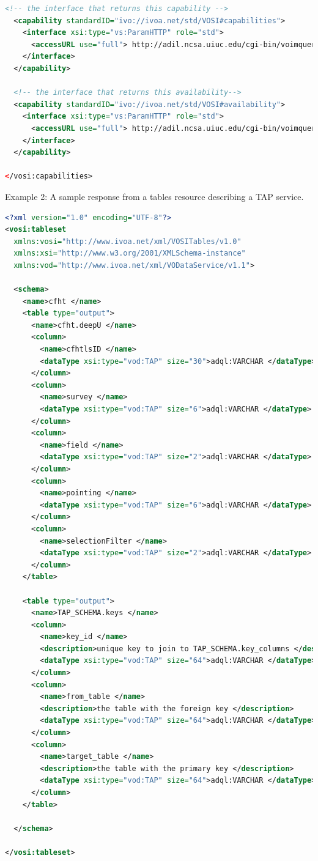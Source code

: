 \documentclass[11pt,letter]{ivoa}
\begin{document}
\begin{lstlisting}[language=XML]
  <!-- the interface that returns this capability -->
  <capability standardID="ivo://ivoa.net/std/VOSI#capabilities">
    <interface xsi:type="vs:ParamHTTP" role="std">
      <accessURL use="full"> http://adil.ncsa.uiuc.edu/cgi-bin/voimquery/capabilities </accessURL>
    </interface>
  </capability>

  <!-- the interface that returns this availability-->
  <capability standardID="ivo://ivoa.net/std/VOSI#availability">
    <interface xsi:type="vs:ParamHTTP" role="std">
      <accessURL use="full"> http://adil.ncsa.uiuc.edu/cgi-bin/voimquery/availability </accessURL>
    </interface>
  </capability>

</vosi:capabilities>
\end{lstlisting}


Example 2:
A sample response from a tables resource describing a TAP service. 

\begin{lstlisting}[language=XML]
<?xml version="1.0" encoding="UTF-8"?>
<vosi:tableset
  xmlns:vosi="http://www.ivoa.net/xml/VOSITables/v1.0"
  xmlns:xsi="http://www.w3.org/2001/XMLSchema-instance"
  xmlns:vod="http://www.ivoa.net/xml/VODataService/v1.1">

  <schema>
    <name>cfht </name>
    <table type="output">
      <name>cfht.deepU </name>
      <column>
        <name>cfhtlsID </name>
        <dataType xsi:type="vod:TAP" size="30">adql:VARCHAR </dataType>
      </column>
      <column>
        <name>survey </name>
        <dataType xsi:type="vod:TAP" size="6">adql:VARCHAR </dataType>
      </column>
      <column>
        <name>field </name>
        <dataType xsi:type="vod:TAP" size="2">adql:VARCHAR </dataType>
      </column>
      <column>
        <name>pointing </name>
        <dataType xsi:type="vod:TAP" size="6">adql:VARCHAR </dataType>
      </column>
      <column>
        <name>selectionFilter </name>
        <dataType xsi:type="vod:TAP" size="2">adql:VARCHAR </dataType>
      </column>
    </table>

    <table type="output">
      <name>TAP_SCHEMA.keys </name>
      <column>
        <name>key_id </name>
        <description>unique key to join to TAP_SCHEMA.key_columns </description>
        <dataType xsi:type="vod:TAP" size="64">adql:VARCHAR </dataType>
      </column>
      <column>
        <name>from_table </name>
        <description>the table with the foreign key </description>
        <dataType xsi:type="vod:TAP" size="64">adql:VARCHAR </dataType>
      </column>
      <column>
        <name>target_table </name>
        <description>the table with the primary key </description>
        <dataType xsi:type="vod:TAP" size="64">adql:VARCHAR </dataType>
      </column>
    </table>

  </schema>

</vosi:tableset>
\end{lstlisting}
\end{document}
